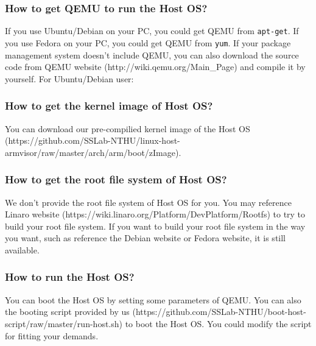 \documentclass[12pt]{article}  %
\begin{document}
\subsubsection{How to get QEMU to run the Host OS?}
If you use Ubuntu/Debian on your PC, you could get QEMU from \texttt{apt-get}. If you use Fedora on your PC, you could get QEMU from \texttt{yum}. If your package management system doesn't include QEMU, you can also download the source code from QEMU website (http://wiki.qemu.org/Main\_Page) and compile it by yourself.\newline\newline
For Ubuntu/Debian user:\newline
{}

\subsubsection{How to get the kernel image of Host OS?}
You can download our pre-compilied kernel image of the Host OS (https://github.com/SSLab-NTHU/linux-host-armvisor/raw/master/arch/arm/boot/zImage).\newline
{}\newline
{}\newline
{}\newline
{}\newline

\subsubsection{How to get the root file system of Host OS?}
We don't provide the root file system of Host OS for you. You may reference Linaro website (https://wiki.linaro.org/Platform/DevPlatform/Rootfs) to try to build your root file system.  If you want to build your root file system in the way you want, such as reference the Debian website or Fedora website, it is still available.

\subsubsection{How to run the Host OS?}
You can boot the Host OS by setting some parameters of QEMU. You can also the booting script provided by us (https://github.com/SSLab-NTHU/boot-host-script/raw/master/run-host.sh) to boot the Host OS.\newline
{}\newline
{}\newline
You could modify the script for fitting your demands.
\end{document}

